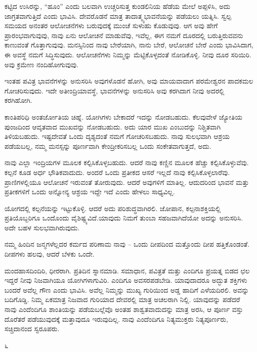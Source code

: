 ಕಟ್ಟಿದ ಉಸಿರನ್ನು, “ಹೂಂ” ಎಂದು ಬಲವಾಗಿ ಉಚ್ಚರಿಸುತ್ತ ಕುಂಡಲಿನಿಯ ಹೆಡೆಯ ಮೇಲೆ ಅಪ್ಪಳಿಸಿ, ಅದು ಜಾಗ್ರತವಾಗುತ್ತಿದೆ ಎಂದು ಭಾವಿಸಿ. ದೇವರೊಡನೆ ಮಾತ್ರ ತಾದಾತ್ಮ್ಯಭಾವನೆಯನ್ನು ಪಡೆಯಲು ಯತ್ನಿಸಿ. ಸ್ವಲ್ಪ ಸಮಯದ ಅನಂತರ ಆಲೋಚನೆಗಳು ಬರುವುದಕ್ಕೆ ಮುಂಚೆ ಸುಳುಹು ಕೊಡುವುವು. ಆಗ ಅವು ಹೇಗೆ ಪ್ರಾರಂಭವಾಗುವುವು, ನಾವು ಏನು ಆಲೋಚನೆ ಮಾಡುವೆವು, ಇವೆಲ್ಲ, ಈಗ ನಮಗೆ ದೂರದಲ್ಲಿ ಬರುತ್ತಿರುವವನು ಕಾಣುವಂತೆ ಗೊತ್ತಾಗುವುವು. ಮನಸ್ಸಿನಿಂದ ನಾವು ಬೇರೆಯಾಗಿ, ನಾನು ಬೇರೆ, ಆಲೋಚನೆ ಬೇರೆ ಎಂದು ಭಾವಿಸಿದಾಗ, ಈ ಅವಸ್ಥೆ ನಮಗೆ ಸಿದ್ಧಿಸುವುದು. ಆಲೋಚನೆಗಳು ನಿಮ್ಮನ್ನು ಮೆಟ್ಟಿಕೊಳ್ಳದಂತೆ ನೋಡಿಕೊಳ್ಳಿ. ನೀವು ದೂರ ಸರಿಯಿರಿ. ಅವು ಕ್ರಮೇಣ ನಂದಿಹೋಗುವುವು.

ಇಂತಹ ಪವಿತ್ರ ಭಾವನೆಗಳನ್ನು ಅನುಸರಿಸಿ ಅವುಗಳೊಡನೆ ಹೋಗಿ, ಅವು ಮಾಯವಾದಾಗ ಪರಮೇಶ್ವರನ ಪಾದಕಮಲ ಗೋಚರಿಸುವುದು. ಇದೇ ಅತೀಂದ್ರಿಯಾವಸ್ಥೆ, ಭಾವನೆಗಳನ್ನು ಅನುಸರಿಸಿ ಅವು ಕರಗಿದಾಗ ನೀವು ಅದರಲ್ಲಿ ಕರಗಿಹೋಗಿ.

ಕಾಂತಿಪರಿಧಿ ಅಂತರ್ಜೋತಿಯ ಚಿಹ್ನೆ. ಯೋಗಿಗಳು ಬೇಕಾದರೆ ಇದನ್ನು ನೋಡಬಹುದು. ಕೆಲವುವೇಳೆ ಜ್ಯೋತಿಯ ಪುಂಜದಿಂದ ಆವೃತವಾದ ಮುಖವನ್ನು ನೋಡಬಹುದು. ಅದು ಯಾರ ಮುಖ ಎಂಬುದನ್ನು ನಿಶ್ಚಿತವಾಗಿ ತಿಳಿಯಬಹುದು. ಇಷ್ಟದೇವತೆ ಒಂದು ದೃಶ್ಯದಂತೆ ನಮಗೆ ಗೋಚರಿಸಬಹುದು. ನಾವು ಸುಲಭವಾಗಿ ಆಶ್ರಯ ಪಡೆಯಬಲ್ಲ, ನಮ್ಮ ಮನಸ್ಸನ್ನು ಪೂರ್ಣವಾಗಿ ಕೇಂದ್ರೀಕರಿಸಬಲ್ಲ ಒಂದು ಸಂಕೇತವಾಗುತ್ತದೆ, ಅದು.

ನಾವು ಎಲ್ಲಾ ಇಂದ್ರಿಯಗಳ ಮೂಲಕ ಕಲ್ಪಿಸಿಕೊಳ್ಳಬಹುದು. ಆದರೆ ನಾವು ಕಣ್ಣಿನ ಮೂಲಕ ಹೆಚ್ಚು ಕಲ್ಪಿಸಿಕೊಳ್ಳುವೆವು. ಕಲ್ಪನೆ ಕೂಡ ಅರ್ಧ ಭೌತಿಕವಾದುದು. ಅಂದರೆ ಒಂದು ಪ್ರತೀಕದ ಆಸರೆ ಇಲ್ಲದೆ ನಾವು ಕಲ್ಪಿಸಿಕೊಳ್ಳಲಾರೆವು. ಪ್ರಾಣಿಗಳಲ್ಲಿಯೂ ಆಲೋಚನೆ ಇರುವಂತೆ ತೋರುವುದು. ಆದರೆ ಅವುಗಳಿಗೆ ಮಾತಿಲ್ಲ. ಆದುದರಿಂದ ಭಾವನೆ ಮತ್ತು ಪ್ರತೀಕಗಳಿಗೆ ಒಂದು ಅನ್ನೋನ್ಯ ಆಶ್ರಯ ಇದ್ದೇ ಇದೆ ಎಂದು ಹೇಳಲು ಸಾಧ್ಯವಿಲ್ಲ.

ಯೋಗದಲ್ಲಿ ಕಲ್ಪನೆಯನ್ನು ಇಟ್ಟುಕೊಳ್ಳಿ. ಆದರೆ ಅದು ಪರಿಶುದ್ಧವಾಗಿರಲಿ. ಜೋಪಾನ, ಕಲ್ಪನಾಶಕ್ತಿಯಲ್ಲಿ ಪ್ರತಿಯೊಬ್ಬರಿಗೂ ಒಂದೊಂದು ವೈಶಿಷ್ಟ್ಯವಿದೆ.\break ಯಾವುದು ನಿಮಗೆ ತುಂಬಾ ಸಹಜವಾಗಿದೆಯೋ ಅದನ್ನು ಅನುಸರಿಸಿ. ಅದೇ ಬಹಳ ಸುಲಭವಾಗಿರುವುದು.

ನಮ್ಮ ಹಿಂದಿನ ಜನ್ಮಗಳೆಲ್ಲದರ ಕರ್ಮದ ಪರಿಣಾಮ ನಾವು – ಒಂದು ದೀಪದಿಂದ ಮತ್ತೊಂದು ದೀಪ ಹತ್ತಿಕೊಂಡಂತೆ. ದೀಪಗಳು ಹಲವು, ಆದರೆ ಬೆಳಕು ಒಂದೇ.

ಮಂದಹಾಸದಿಂದಿರಿ, ಧೀರರಾಗಿ. ಪ್ರತಿದಿನ ಸ್ನಾನಮಾಡಿ. ಸಮಾಧಾನ, ಪವಿತ್ರತೆ ಮತ್ತು ಎಂದಿಗೂ ಪ್ರಯತ್ನ ಬಿಡದ ಛಲ ಇದ್ದರೆ ನೀವು ನಿಜವಾಗಿಯೂ ಯೋಗಿಗಳಾಗುವಿರಿ. ಎಂದಿಗೂ ಅವಸರಪಡಬೇಡಿ. ಯಾವುದಾದರೂ ಅದ್ಭುತ ಶಕ್ತಿಗಳು ಬಂದರೆ ಅವೆಲ್ಲ ಗೌಣ ಎಂದು ಭಾವಿಸಿ. ಅವೆಲ್ಲ ನಿಮ್ಮನ್ನು ಮುಖ್ಯ ಗುರಿಯಿಂದ ಅಡ್ಡ ಹಾದಿಗೆ ಎಳೆಯದಿರಲಿ. ಅವನ್ನು ಬದಿಗೊಡ್ಡಿ. ನಿಮ್ಮ ಏಕಮಾತ್ರ ನಿಜವಾದ ಗುರಿಯಾದ ದೇವರಲ್ಲಿ ಮಾತ್ರ ಅಚಲರಾಗಿ ನಿಲ್ಲಿ. ಯಾವುದನ್ನು ಪಡೆದರೆ ನಾವು ಎಂದೆಂದಿಗೂ ಶಾಂತಿಯನ್ನು ಪಡೆಯಬಲ್ಲೆವೊ ಅಂತಹ ಶಾಶ್ವತವಾದುದನ್ನು ಮಾತ್ರ ಅರಸಿ, ಆ ಪೂರ್ಣ ವಸ್ತು ದೊರೆತರೆ ಪಡೆಯುವುದಕ್ಕೆ ಮತ್ತಾವುದೂ ಇರುವುದಿಲ್ಲ. ನಾವು ಎಂದೆಂದಿಗೂ ನಿತ್ಯಮುಕ್ತರು ನಿತ್ಯಪೂರ್ಣರು, ಸಚ್ಚಿದಾನಂದ ಸ್ವರೂಪರು.

\begin{center}
೬
\end{center}

